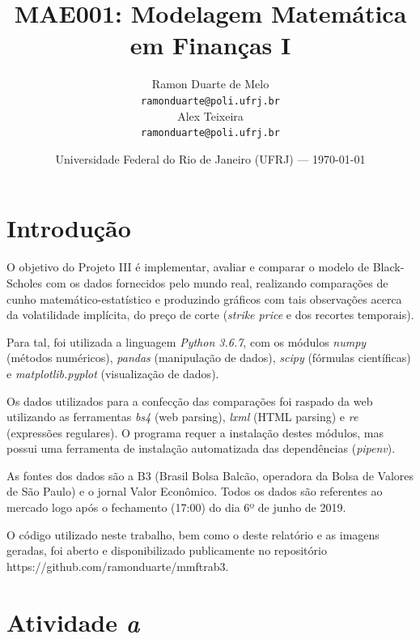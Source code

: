 \documentclass{article}
\title{MAE001: Modelagem Matemática em Finanças I} %
\author{Ramon Duarte de Melo\\ \texttt{ramonduarte@poli.ufrj.br} %
\\ Alex Teixeira\\ \texttt{ramonduarte@poli.ufrj.br}} %
\date{Universidade Federal do Rio de Janeiro (UFRJ) --- \today} %
\begin{document}
\maketitle %


\section*{Introdução} %

O objetivo do Projeto III é implementar, avaliar e comparar o modelo de Black-Scholes com os dados fornecidos pelo mundo real, realizando comparações de cunho matemático-estatístico e produzindo gráficos com tais observações acerca da volatilidade implícita, do preço de corte (\emph{strike price} e dos recortes temporais). 

Para tal, foi utilizada a linguagem \emph{Python 3.6.7}, com os módulos \emph{numpy} (métodos numéricos), \emph{pandas} (manipulação de dados), \emph{scipy} (fórmulas científicas) e \emph{matplotlib.pyplot} (visualização de dados).

Os dados utilizados para a confecção das comparações foi raspado da web utilizando as ferramentas \emph{bs4} (web parsing), \emph{lxml} (HTML parsing) e \emph{re} (expressões regulares). O programa requer a instalação destes módulos, mas possui uma ferramenta de instalação automatizada das dependências (\emph{pipenv}). 

As fontes dos dados são a B3 (Brasil Bolsa Balcão, operadora da Bolsa de Valores de São Paulo) e o jornal Valor Econômico. Todos os dados são referentes ao mercado logo após o fechamento (17:00) do dia 6º de junho de 2019.


O código utilizado neste trabalho, bem como o deste relatório e as imagens geradas, foi aberto e disponibilizado publicamente no repositório https://github.com/ramonduarte/mmftrab3.



\section*{Atividade \emph{a}} %
\end{document}
